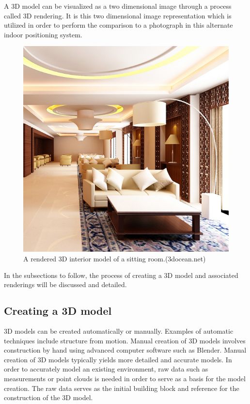 \documentclass[11pt,a4paper]{report}
\begin{document}
		A 3D model can be visualized as a two dimensional image through a process called 3D rendering. It is this two dimensional image representation which is utilized in order to perform the comparison to a photograph in this alternate indoor positioning system.
		
		\begin{figure}[H]
			\centering
			\includegraphics[width=1\textwidth]{rendered_3d_model}
			\caption[3D interior model]{A rendered 3D interior model of a sitting room.(3docean.net)}
			\label{fig:rendered_3d_model}
		\end{figure}
		
		In the subsections to follow, the process of creating a 3D model and associated renderings will be discussed and detailed.
		
		\subsection{Creating a 3D model}
			3D models can be created automatically or manually. Examples of automatic techniques include structure from motion. Manual creation of 3D models involves construction by hand using advanced computer software such as Blender. Manual creation of 3D models typically yields more detailed and accurate models. 
			In order to accurately model an existing environment, raw data such as measurements or point clouds is needed in order to serve as a basis for the model creation. The raw data serves as the initial building block and reference for the construction of the 3D model.
		
\end{document}
